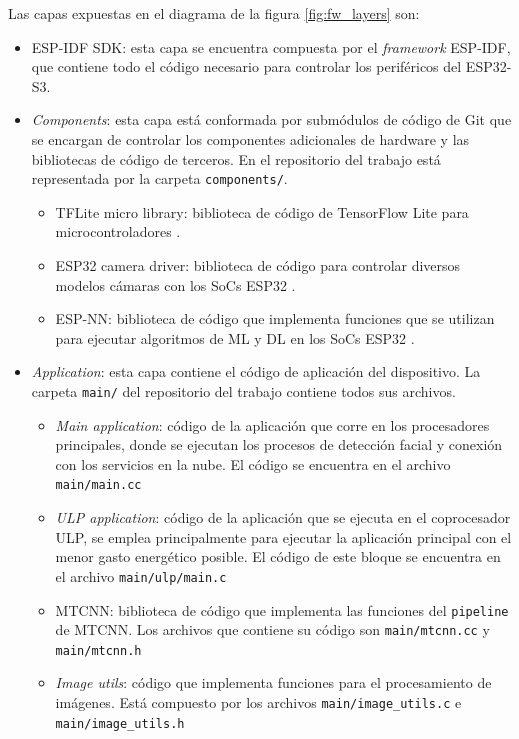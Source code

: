 \newpage

Las capas expuestas en el diagrama de la figura \ref{fig:fw_layers} son:
\begin{itemize}
	\item ESP-IDF SDK: esta capa se encuentra compuesta por el \textit{framework} ESP-IDF, que contiene todo el código necesario para controlar los periféricos del ESP32-S3.
	\item \textit{Components}: esta capa está conformada por submódulos de código de Git que se encargan de controlar los componentes adicionales de hardware y las bibliotecas de código de terceros. En el repositorio del trabajo \cite{mtcnn_repo} está representada por la carpeta \texttt{components/}.
	\begin{itemize}
		\item TFLite micro library: biblioteca de código de TensorFlow Lite para microcontroladores \cite{tflm_repo}.
		\item ESP32 camera driver: biblioteca de código para controlar diversos modelos cámaras con los SoCs ESP32 \cite{esp32cam_repo}.
		\item ESP-NN: biblioteca de código que implementa funciones que se utilizan para ejecutar algoritmos de ML y DL en los SoCs ESP32 \cite{espnn_repo}.
	\end{itemize}
	\item \textit{Application}: esta capa contiene el código de aplicación del dispositivo. La carpeta \texttt{main/} del repositorio del trabajo \cite{mtcnn_repo} contiene todos sus archivos.
	\begin{itemize}
		\item \textit{Main application}: código de la aplicación que corre en los procesadores principales, donde se ejecutan los procesos de detección facial y conexión con los servicios en la nube. El código se encuentra en el archivo \texttt{main/main.cc}
		\item \textit{ULP application}: código de la aplicación que se ejecuta en el coprocesador ULP, se emplea principalmente para ejecutar la aplicación principal con el menor gasto energético posible. El código de este bloque se encuentra en el archivo \texttt{main/ulp/main.c}
		\item MTCNN: biblioteca de código que implementa las funciones del \texttt{pipeline} de MTCNN. Los archivos que contiene su código son \texttt{main/mtcnn.cc} y \texttt{main/mtcnn.h}
		\item \textit{Image utils}: código que implementa funciones para el procesamiento de imágenes. Está compuesto por los archivos \texttt{main/image\_utils.c} e \texttt{main/image\_utils.h}
	\end{itemize}
\end{itemize}

